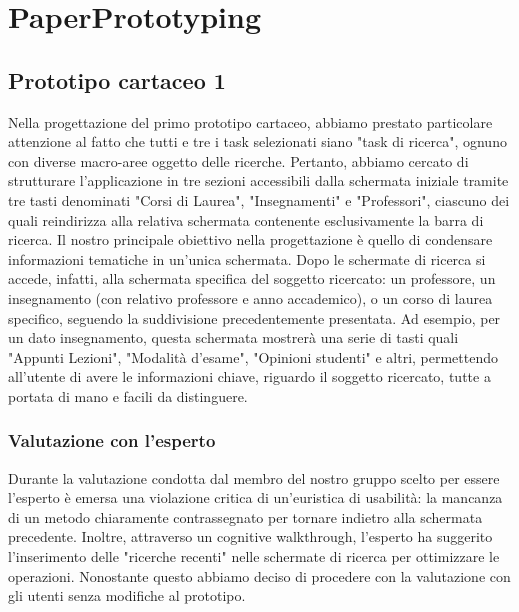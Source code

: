 \chapter{PaperPrototyping}

\section{Prototipo cartaceo 1}
Nella progettazione del primo prototipo cartaceo, abbiamo prestato particolare attenzione al fatto che tutti e tre i task selezionati
siano "task di ricerca", ognuno con diverse macro-aree oggetto delle ricerche. Pertanto, abbiamo cercato di strutturare l'applicazione
in tre sezioni accessibili dalla schermata iniziale tramite tre tasti denominati "Corsi di Laurea", "Insegnamenti" e "Professori", ciascuno
dei quali reindirizza alla relativa schermata contenente esclusivamente la barra di ricerca.
Il nostro principale obiettivo nella progettazione è quello di condensare informazioni tematiche in un'unica schermata. Dopo le schermate
di ricerca si accede, infatti, alla schermata specifica del soggetto ricercato: un professore, un insegnamento (con relativo professore e
anno accademico), o un corso di laurea specifico, seguendo la suddivisione precedentemente presentata. Ad esempio, per un dato insegnamento,
questa schermata mostrerà una serie di tasti quali "Appunti Lezioni", "Modalità d'esame", "Opinioni studenti" e altri, permettendo all'utente
di avere le informazioni chiave, riguardo il soggetto ricercato, tutte a portata di mano e facili da distinguere.


\subsection{Valutazione con l'esperto}
Durante la valutazione condotta dal membro del nostro gruppo scelto per essere l'esperto è emersa una violazione critica di un'euristica di
usabilità: la mancanza di un metodo chiaramente contrassegnato per tornare indietro alla schermata precedente.
Inoltre, attraverso un cognitive walkthrough, l'esperto ha suggerito l'inserimento delle "ricerche recenti" nelle schermate di ricerca per ottimizzare le operazioni.
Nonostante questo abbiamo deciso di procedere con la valutazione con gli utenti senza modifiche al prototipo.


